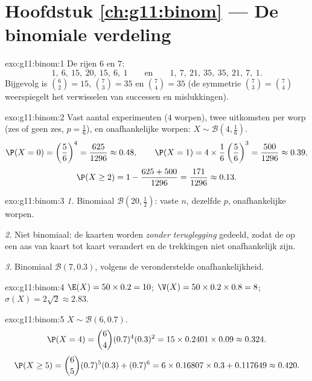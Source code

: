 \section*{Hoofdstuk \ref{ch:g11:binom} --- De binomiale verdeling}

\begin{solution}{exo:g11:binom:1}
De rijen $6$ en $7$:
\[
1,\ 6,\ 15,\ 20,\ 15,\ 6,\ 1
\qquad\text{en}\qquad
1,\ 7,\ 21,\ 35,\ 35,\ 21,\ 7,\ 1 .
\]
Bijgevolg is $\binom62 = 15$, $\binom73 = 35$ en $\binom74 = 35$ (de
symmetrie $\binom73 = \binom74$ weerspiegelt het verwisselen van successen en
mislukkingen).
\end{solution}

\begin{solution}{exo:g11:binom:2}
Vast aantal experimenten ($4$ worpen), twee uitkomsten per worp (zes of geen
zes, $p = \frac16$), en onafhankelijke worpen: $X \sim \mathcal B(4,
\frac16)$.
\[
\P(X=0) = \left(\frac56\right)^4 = \frac{625}{1296} \approx 0.48,
\qquad
\P(X=1) = 4 \times \frac16\left(\frac56\right)^3 = \frac{500}{1296}
\approx 0.39,
\]
\[
\P(X \geq 2) = 1 - \frac{625 + 500}{1296} = \frac{171}{1296}
\approx 0.13 .
\]
\end{solution}

\begin{solution}{exo:g11:binom:3}
\emph{1.} Binomiaal $\mathcal B(20, \frac12)$: vaste $n$, dezelfde $p$,
onafhankelijke worpen.

\emph{2.} Niet binomiaal: de kaarten worden \emph{zonder teruglegging}
gedeeld, zodat de  op een aas van kaart tot kaart verandert en de
trekkingen niet onafhankelijk zijn.

\emph{3.} Binomiaal $\mathcal B(7, 0.3)$, volgens de veronderstelde
onafhankelijkheid.
\end{solution}

\begin{solution}{exo:g11:binom:4}
$\E(X) = 50 \times 0.2 = 10$; $\V(X) = 50 \times 0.2 \times 0.8 = 8$;
$\sigma(X) = 2\sqrt2 \approx 2.83$.
\end{solution}

\begin{solution}{exo:g11:binom:5}
$X \sim \mathcal B(6, 0.7)$.
\[
\P(X = 4) = \binom64 (0.7)^4 (0.3)^2 = 15 \times 0.2401 \times 0.09
\approx 0.324 .
\]
\[
\P(X \geq 5) = \binom65 (0.7)^5(0.3) + (0.7)^6
= 6 \times 0.16807 \times 0.3 + 0.117649 \approx 0.420 .
\]
\end{solution}

